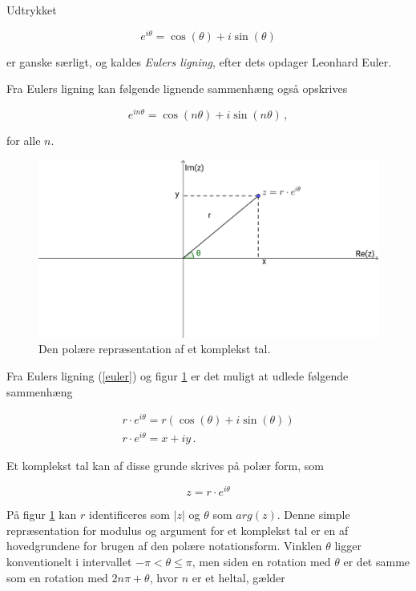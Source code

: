 \documentclass[a4paper, 12pt,titlepage]{article}
\begin{document}
Udtrykket 

\begin{equation}
\label{euler}
    e^{i\theta} = \cos \left(\theta\right) + i \sin \left(\theta\right)
\end{equation}

er ganske særligt, og kaldes \emph{Eulers ligning}, efter dets opdager Leonhard Euler.

Fra Eulers ligning kan følgende lignende sammenhæng også opskrives

$$e^{i n \theta} = \cos \left(n \theta\right) + i \sin \left(n \theta\right)\,,$$

for alle \(n\).

\begin{figure}[htbp]
\centering
\includegraphics[width=.9\linewidth]{./img/euler.png}
\caption{\label{fig_euler}Den polære repræsentation af et komplekst tal.}
\end{figure}

Fra Eulers ligning (\ref{euler}) og figur \ref{fig_euler} er det muligt at udlede følgende sammenhæng

\begin{align*}
    r \cdot e^{i\theta} = r \left(\cos\left(\theta\right) + i \sin\left(\theta\right)\right)\\
    r \cdot e^{i\theta} = x + iy \,.
\end{align*}

Et komplekst tal kan af disse grunde skrives på  polær form, som

\begin{equation}
    z = r \cdot e^{i \theta}
\end{equation}

På figur \ref{fig_euler} kan \(r\) identificeres som \(|z|\) og \(\theta\) som \(arg(z)\). Denne simple repræsentation for modulus og argument for et komplekst tal er en af hovedgrundene for brugen af den polære notationsform. Vinklen \(\theta\) ligger konventionelt i intervallet \(-\pi < \theta \leq \pi\), men siden en rotation med \(\theta\) er det samme som en rotation med \(2 n \pi + \theta\), hvor \(n\) er et heltal, gælder
\end{document}
